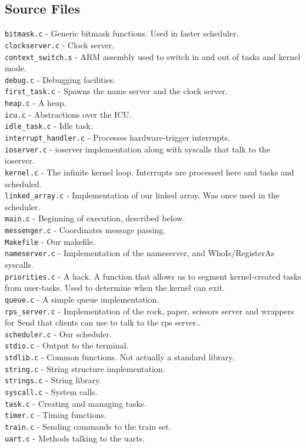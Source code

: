 \documentclass[letterpaper]{article}
\begin{document}
\subsection{Source Files}
\verb!bitmask.c! - Generic bitmask functions. Used in faster scheduler.\\
\verb!clockserver.c! - Clock server.\\
\verb!context_switch.s! - ARM assembly used to switch in and out of tasks and kernel mode.\\
\verb!debug.c! - Debugging facilities.\\
\verb!first_task.c! - Spawns the name server and the clock server.\\
\verb!heap.c! - A heap.\\
\verb!icu.c! - Abstractions over the ICU.\\
\verb!idle_task.c! - Idle task.\\
\verb!interrupt_handler.c! - Processes hardware-trigger interrupts.\\
\verb!ioserver.c! - ioserver implementation along with syscalls that talk to the ioserver.\\
\verb!kernel.c! - The infinite kernel loop. Interrupts are processed here and tasks and scheduled.\\
\verb!linked_array.c! - Implementation of our linked array. Was once used in the scheduler. \\
\verb!main.c! - Beginning of execution, described below.\\
\verb!messenger.c! - Coordinates message passing.\\
\verb!Makefile! - Our makefile.\\
\verb!nameserver.c! - Implementation of the nameserver, and WhoIs/RegisterAs syscalls.\\
\verb!priorities.c! - A hack. A function that allows us to segment kernel-created tasks from user-tasks. Used to determine when the kernel can exit.\\
\verb!queue.c! - A simple queue implementation.\\
\verb!rps_server.c! - Implementation of the rock, paper, scissors server and wrappers for Send that clients can use to talk to the rps server..\\
\verb!scheduler.c! - Our scheduler.\\
\verb!stdio.c! - Output to the terminal.\\
\verb!stdlib.c! - Common functions. Not actually a standard library.\\
\verb!string.c! - String structure implementation.\\
\verb!strings.c! - String library.\\
\verb!syscall.c! - System calls.\\
\verb!task.c! - Creating and managing tasks.\\
\verb!timer.c! - Timing functions.\\
\verb!train.c! - Sending commands to the train set.\\
\verb!uart.c! - Methods talking to the uarts.\\
\end{document}
